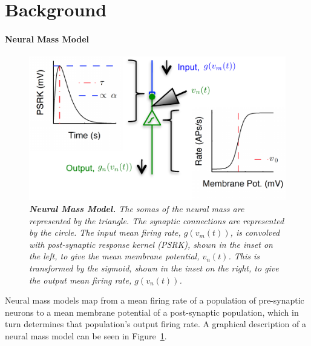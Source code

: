 \documentclass{article}
\begin{document}

\section{Background}
\label{sec:background}


\paragraph{Neural Mass Model}
\begin{figure}[ht]
  \begin{center}
    \includegraphics{./figures/pdf/SingleMass_plos.pdf}
  \end{center}
  \caption{\emph{\textbf{Neural Mass Model.} The somas of the neural mass are represented by the triangle. The synaptic connections are represented by the circle. The input mean firing rate, $g(v_m(t))$, is convolved with post-synaptic response kernel (PSRK), shown in the inset on the left, to give the mean membrane potential, $v_n(t)$. This is transformed by the sigmoid, shown in the inset on the right, to give the output mean firing rate, $g(v_n(t))$.}}
  \label{fig:SingleNeuralMass}
\end{figure}
Neural mass models map from a mean firing rate of a population of pre-synaptic neurons to a mean membrane potential of a post-synaptic population, which in turn determines that population's output firing rate. A graphical description of a neural mass model can be seen in Figure~\ref{fig:SingleNeuralMass}. 
\end{document}
